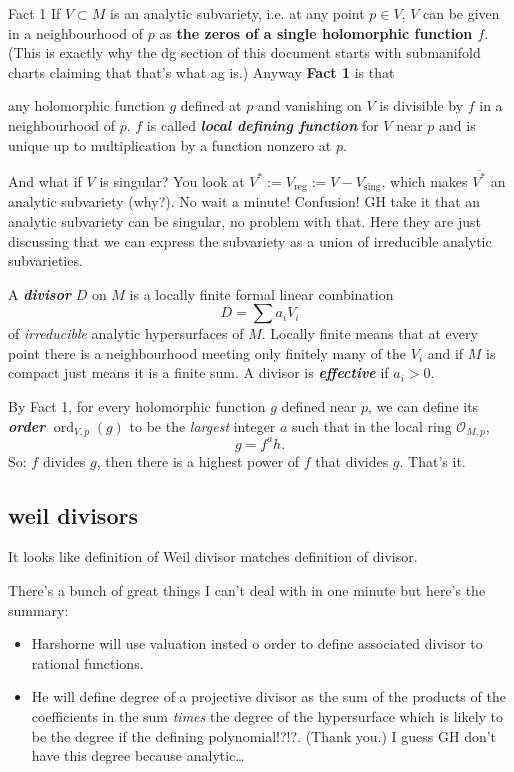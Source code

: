 \begin{thing1}{Fact 1}\leavevmode
If \(V \subset M\) is an analytic subvariety, i.e. at any point \(p \in V\), \(V\) can be given in a neighbourhood of \(p\) as \textbf{the zeros of a single holomorphic function \(f\)}. (This is exactly why the dg section of this document starts with submanifold charts claiming that that's what ag is.) Anyway \textbf{Fact 1} is that
\begin{tcolorbox}[colback=white,colframe=black,boxrule=0.5pt,sharp corners]
any holomorphic function \(g\) defined at \(p\) and vanishing on \(V\) is divisible by \(f\) in a neighbourhood of \(p\). \(f\) is called  \textit{\textbf{local defining function }} for \(V\) near \(p\) and is unique up to multiplication by a function nonzero at \(p\).
\end{tcolorbox}
\end{thing1}
And what if \(V\) is singular? You look at \(V^*:=V_{\operatorname{reg}}:=V-V_{\operatorname{sing}}\), which makes \(\overline{V^*}\) an analytic subvariety (why?). No wait a minute! Confusion! GH take it that an analytic subvariety can be singular, no problem with that. Here they are just discussing that we can express the subvariety as a union of irreducible analytic subvarieties.

A \textit{\textbf{divisor}} \(D\) on \(M\) is a locally finite formal linear combination
\[D=\sum a_i V_i\]
of \textit{irreducible} analytic hypersurfaces of \(M\). Locally finite means that at every point there is a neighbourhood meeting only finitely many of the \(V_i\) and if \(M\) is compact just means it is a finite sum. A divisor is  \textit{\textbf{effective}} if \(a_i>0\).

By Fact 1, for every holomorphic function \(g\) defined near \(p\), we can define its \textit{\textbf{order}} \(\operatorname{ord}_{V,p}(g)\) to be the \textit{largest} integer \(a\) such that in the local ring \(\mathcal{O}_{M,p}\),
\[g=f^ah.\]
So: \(f\) divides \(g\), then there is a highest power of \(f\) that divides \(g\). That's it.

\subsection{weil divisors}

It looks like \cite{har} definition of Weil divisor matches \cite{gri} definition of divisor.

There's a bunch of great things I can't deal with in one minute but here's the summary:
\begin{itemize}
\item Harshorne will use valuation insted o order to define associated divisor to rational functions.
\item He will define degree of a projective divisor as the sum of the products of the coefficients in the sum \textit{times} the degree of the hypersurface which is likely to be the degree if the defining polynomial!?!?. (Thank you.) I guess GH don't have this degree because analytic…
\end{itemize}

